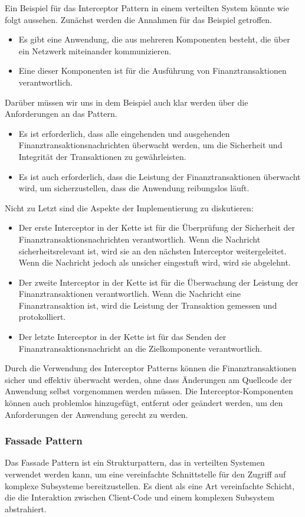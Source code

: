\documentclass[../vs-script-first-v01.tex]{subfiles}
\begin{document}
Ein Beispiel für das Interceptor Pattern in einem verteilten System könnte wie folgt aussehen. Zunächst werden die Annahmen für das Beispiel getroffen. 
\begin{itemize}   
\item Es gibt eine Anwendung, die aus mehreren Komponenten besteht, die über ein Netzwerk miteinander kommunizieren.
\item Eine dieser Komponenten ist für die Ausführung von Finanztransaktionen verantwortlich.
\end{itemize}   
Darüber müssen wir uns in dem Beispiel auch klar werden über die Anforderungen an das Pattern.
\begin{itemize}   
\item Es ist erforderlich, dass alle eingehenden und ausgehenden Finanztransaktionsnachrichten überwacht werden, um die Sicherheit und Integrität der Transaktionen zu gewährleisten.
\item Es ist auch erforderlich, dass die Leistung der Finanztransaktionen überwacht wird, um sicherzustellen, dass die Anwendung reibungslos läuft.
\end{itemize}   
Nicht zu Letzt sind die Aspekte der Implementierung zu diskutieren:
\begin{itemize}   
\item Der erste Interceptor in der Kette ist für die Überprüfung der Sicherheit der Finanztransaktionsnachrichten verantwortlich. Wenn die Nachricht sicherheitsrelevant ist, wird sie an den nächsten Interceptor weitergeleitet. Wenn die Nachricht jedoch als unsicher eingestuft wird, wird sie abgelehnt.
\item Der zweite Interceptor in der Kette ist für die Überwachung der Leistung der Finanztransaktionen verantwortlich. Wenn die Nachricht eine Finanztransaktion ist, wird die Leistung der Transaktion gemessen und protokolliert.
\item Der letzte Interceptor in der Kette ist für das Senden der Finanztransaktionsnachricht an die Zielkomponente verantwortlich.
\end{itemize} 
Durch die Verwendung des Interceptor Patterns können die Finanztransaktionen sicher und effektiv überwacht werden, ohne dass Änderungen am Quellcode der Anwendung selbst vorgenommen werden müssen. Die Interceptor-Komponenten können auch problemlos hinzugefügt, entfernt oder geändert werden, um den Anforderungen der Anwendung gerecht zu werden.

\subsubsection{Fassade Pattern}
Das Fassade Pattern ist ein Strukturpattern, das in verteilten Systemen verwendet werden kann, um eine vereinfachte Schnittstelle für den Zugriff auf komplexe Subsysteme bereitzustellen. Es dient als eine Art vereinfachte Schicht, die die Interaktion zwischen Client-Code und einem komplexen Subsystem abstrahiert.
\end{document}
